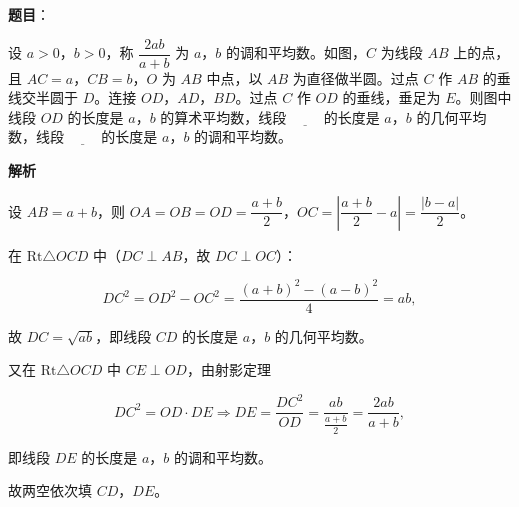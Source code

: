 \begin{answer}

\textbf{题目}：

设 $a>0$，$b>0$，称 $\dfrac{2ab}{a+b}$ 为 $a$，$b$ 的调和平均数。如图，$C$ 为线段 $AB$ 上的点，且 $AC=a$，$CB=b$，$O$ 为 $AB$ 中点，以 $AB$ 为直径做半圆。过点 $C$ 作 $AB$ 的垂线交半圆于 $D$。连接 $OD$，$AD$，$BD$。过点 $C$ 作 $OD$ 的垂线，垂足为 $E$。则图中线段 $OD$ 的长度是 $a$，$b$ 的算术平均数，线段 $\underline{\qquad}$ 的长度是 $a$，$b$ 的几何平均数，线段 $\underline{\qquad}$ 的长度是 $a$，$b$ 的调和平均数。
\nopagebreak[4]
\begin{center}\end{center}
\nopagebreak[4]
\textbf{解析}

设 $AB=a+b$，则 $OA=OB=OD=\dfrac{a+b}{2}$，$OC=\left|\dfrac{a+b}{2}-a\right|=\dfrac{|b-a|}{2}$。

在 $\mathrm{Rt}\triangle OCD$ 中（$DC\perp AB$，故 $DC\perp OC$）：

\nopagebreak[4]
\[DC^2=OD^2-OC^2=\frac{(a+b)^2-(a-b)^2}{4}=ab,\]

故 $DC=\sqrt{ab}$，即线段 $CD$ 的长度是 $a$，$b$ 的几何平均数。

又在 $\mathrm{Rt}\triangle OCD$ 中 $CE\perp OD$，由射影定理

\nopagebreak[4]
\[DC^2=OD\cdot DE\Longrightarrow DE=\frac{DC^2}{OD}=\frac{ab}{\frac{a+b}{2}}=\frac{2ab}{a+b},\]

即线段 $DE$ 的长度是 $a$，$b$ 的调和平均数。

故两空依次填 $CD$，$DE$。


\end{answer}
